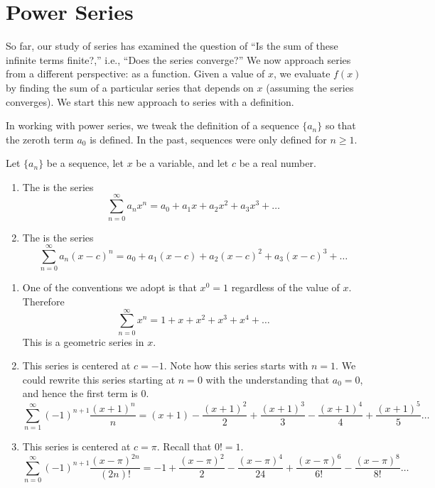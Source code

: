 \section{Power Series}\label{sec:power_series}

So far, our study of series has examined the question of ``Is the sum of these infinite terms finite?,'' i.e., ``Does the series converge?'' We now approach series from a different perspective: as a function. Given a value of $x$, we evaluate $f(x)$ by finding the sum of a particular series that depends on $x$ (assuming the series converges). We start this new approach to series with a definition.

In working with power series, we tweak the definition of a sequence $\{a_n\}$ so that the zeroth term $a_0$ is defined.  In the past, sequences were only defined for $n\geq 1$.

{Let $\{a_n\}$ be a sequence, let $x$ be a variable, and let $c$ be a real number.
	\begin{enumerate}
		\item The  is the series
		$$\sum_{n=0}^\infty a_nx^n = a_0+a_1x+a_2x^2+a_3x^3+\ldots$$
		
		\item The  is the series
		$$\sum_{n=0}^\infty a_n(x-c)^n = a_0+a_1(x-c)+a_2(x-c)^2+a_3(x-c)^3+\ldots$$
	\end{enumerate}
}

{\begin{enumerate}
	\item One of the conventions we adopt is that $x^0=1$ regardless of the value of $x$. Therefore
	$$\sum_{n=0}^\infty x^n = 1+x+x^2+x^3+x^4+\ldots$$
	This is a geometric series in $x$.
	
	\item	This series is centered at $c=-1$. Note how this series starts with $n=1$. We could rewrite this series starting at $n=0$ with the understanding that $a_0=0$, and hence the first term is $0$.
	$$\sum_{n=1}^\infty (-1)^{n+1}\frac{(x+1)^n}n = (x+1) - \frac{(x+1)^2}{2} + \frac{(x+1)^3}{3} - \frac{(x+1)^4}{4}+\frac{(x+1)^5}{5}\ldots$$
	
	\item		This series is centered at $c=\pi$. Recall that $0!=1$.
	$$\sum_{n=0}^\infty (-1)^{n+1} \frac{(x-\pi)^{2n}}{(2n)!} = -1+\frac{(x-\pi)^2}{2} - \frac{(x-\pi)^4}{24}+ \frac{(x-\pi)^6}{6!}-\frac{(x-\pi)^8}{8!}\ldots $$
\end{enumerate}
\baselineskip
}\\

